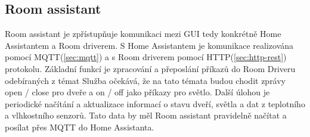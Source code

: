 
\subsection{Room assistant}\label{subsec:room-assistant}
Room assistant je zpřístupňuje komunikaci mezi GUI tedy konkrétně Home Assistantem a Room driverem.\newline
S Home Assistantem je komunikace realizována pomocí MQTT(\ref{sec:mqtt}) a s Room driverem pomocí HTTP(\ref{sec:http-rest}) protokolu.
Základní funkcí je zpracování a přeposlání příkazů do Room Driveru odebíraných z témat
Služba očekává, že na tato témata budou chodit zprávy open / close pro dveře a on / off jako příkazy pro světlo.
Další úlohou je periodické načítání a aktualizace informací o stavu dveří, světla a dat z teplotního a vlhkostního senzorů.
Tato data by měl Room assistant pravidelně načítat a posílat přes MQTT do Home Assistanta.
